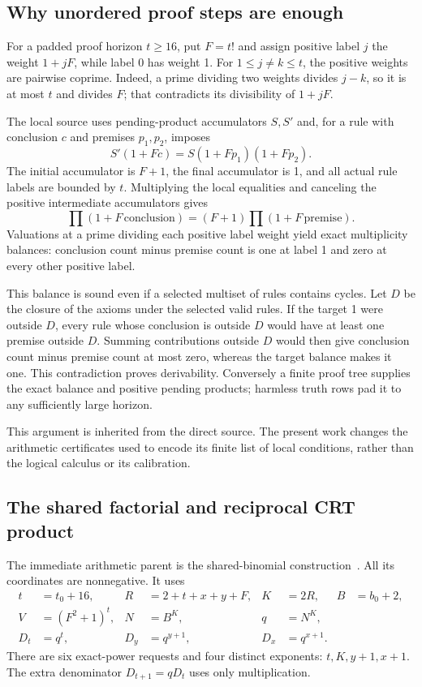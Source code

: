 \documentclass[11pt]{article}
\theoremstyle{definition}\newtheorem{definition}[theorem]{Definition}
\theoremstyle{remark}\newtheorem{remark}[theorem]{Remark}
\begin{document}
\subsection{Why unordered proof steps are enough}

For a padded proof horizon $t\ge16$, put $F=t!$ and assign positive label $j$ the weight $1+jF$, while label 0 has weight 1. For $1\le j\ne k\le t$, the positive weights are pairwise coprime. Indeed, a prime dividing two weights divides $j-k$, so it is at most $t$ and divides $F$; that contradicts its divisibility of $1+jF$.

The local source uses pending-product accumulators $S,S'$ and, for a rule with conclusion $c$ and premises $p_1,p_2$, imposes
\begin{equation}\label{eq:flow}
 S'(1+Fc)=S(1+Fp_1)(1+Fp_2).
\end{equation}
The initial accumulator is $F+1$, the final accumulator is 1, and all actual rule labels are bounded by $t$. Multiplying the local equalities and canceling the positive intermediate accumulators gives
\[
 \prod(1+F\,\text{conclusion})
 =(F+1)\prod(1+F\,\text{premise}).
\]
Valuations at a prime dividing each positive label weight yield exact multiplicity balances: conclusion count minus premise count is one at label 1 and zero at every other positive label.

This balance is sound even if a selected multiset of rules contains cycles. Let $D$ be the closure of the axioms under the selected valid rules. If the target 1 were outside $D$, every rule whose conclusion is outside $D$ would have at least one premise outside $D$. Summing contributions outside $D$ would then give conclusion count minus premise count at most zero, whereas the target balance makes it one. This contradiction proves derivability. Conversely a finite proof tree supplies the exact balance and positive pending products; harmless truth rows pad it to any sufficiently large horizon.

This argument is inherited from the direct source. The present work changes the arithmetic certificates used to encode its finite list of local conditions, rather than the logical calculus or its calibration.

\subsection{The shared factorial and reciprocal CRT product}

The immediate arithmetic parent is the shared-binomial construction~\cite{binomial}. All its coordinates are nonnegative. It uses
\begin{align}\label{eq:semantic}
 t&=t_0+16,& R&=2+t+x+y+F,& K&=2R,& B&=b_0+2,\nonumber\\
 V&=(F^2+1)^t,& N&=B^K,& q&=N^K,\\
 D_t&=q^t,&D_y&=q^{y+1},&D_x&=q^{x+1}.\nonumber
\end{align}
There are six exact-power requests and four distinct exponents: $t,K,y+1,x+1$. The extra denominator $D_{t+1}=qD_t$ uses only multiplication.
\end{document}
